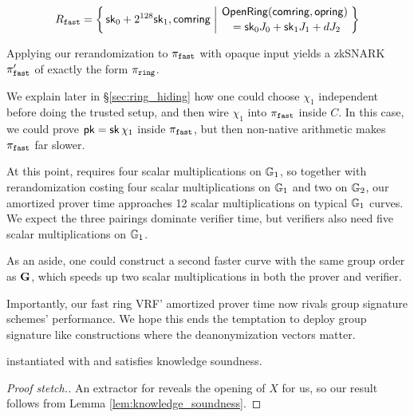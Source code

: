 $$ \Lfast = \Setst{ \sk_0 + 2^{128} \sk_1, \comring }{
 \eprint{ \exists d,\openring \textrm{\ s.t.\ } }{}
 \genfrac{}{}{0pt}{}{ \eprint{\rVRF.}{}\OpenRing(\comring,\openring) }{ \,\, = \sk_0 \genJ_0 + \sk_1 \genJ_1 + d \genJ_2 }
} $$ %

Applying our rerandomization to $\pi_{\mathtt{fast}}$ with opaque input yields
a zkSNARK $\pi_{\mathtt{fast}}'$ of exactly the form $\pi_{\mathtt{ring}}$.

We explain later in \S\ref{sec:ring_hiding} how one could
choose $\chi_1$ independent before doing the trusted setup,
 and then wire $\chi_1$ into $\pi_{\mathtt{fast}}$ inside $C$.
In this case, we could prove $\mathsf{pk} = \mathsf{sk}\, \chi_1$ inside $\pi_{\mathtt{fast}}$, but then
non-native arithmetic makes $\pi_{\mathtt{fast}}$ far slower.

At this point, \PedVRF requires four scalar multiplications on ${\mathbb{G}}_1$,
so together with rerandomization costing four scalar multiplications
on ${\mathbb{G}}_1$ and two on ${\mathbb{G}}_2$, our amortized prover time
 approaches 12 scalar multiplications on typical ${\mathbb{G}}_1$ curves. 
We expect the three pairings dominate verifier time, but
 verifiers also need five scalar multiplications on ${\mathbb{G}}_1$.

As an aside, one could construct a second faster curve with the same
group order as ${\mathbf{G}}$, which speeds up two scalar multiplications
 in both the prover and verifier. 

Importantly, our fast ring VRF' amortized prover time now rivals
group signature schemes' performance.  We hope this ends the temptation
to deploy group signature like constructions where the deanonymization vectors matter.

\begin{theorem}\label{thm:knowledge_soundness}
\rVRF instantiated with \pifast and \PedVRF satisfies knowledge soundness.
\end{theorem}

\begin{proof}[Proof stetch.]
An extractor for \PedVRF reveals the opening of $X$ for us,
so our result follows from Lemma \ref{lem:knowledge_soundness}.
\end{proof}


%



